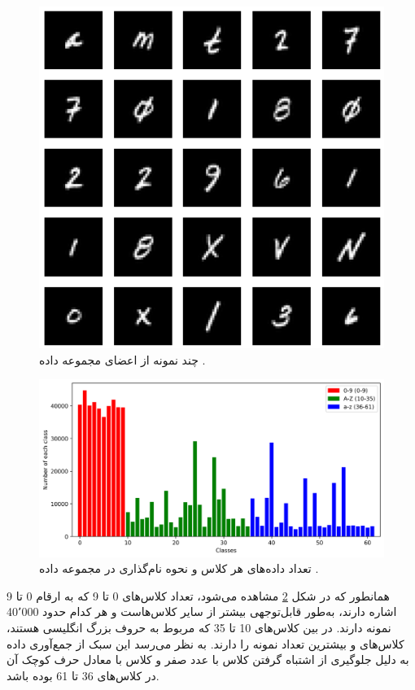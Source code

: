 \begin{figure}[b!]
	\centering
	\includegraphics[scale=0.5]{images/chap5/femnist.png}%
	\caption{%
		چند نمونه از اعضای مجموعه داده
		\cite{holzer2023dynamically}.
	}
	\label{femnist}
	\centering
\end{figure}


\begin{figure}[t]
	\centering
	\includegraphics[scale=0.7]{images/chap5/count_all_classes.png}%
	\caption{%
تعداد داده‌های هر کلاس و نحوه نام‌گذاری در مجموعه داده
		.
	}
	\label{count_all_classes}
	\centering
\end{figure}

همانطور که در شکل
\ref{count_all_classes}
مشاهده می‌شود، تعداد کلاس‌های 0 تا 9 که به ارقام 0 تا 9 اشاره دارند، به‌طور قابل‌توجهی بیشتر از سایر کلاس‌هاست و هر کدام حدود 40٬000 نمونه دارند. در بین کلاس‌های 10 تا 35 که مربوط به حروف بزرگ انگلیسی هستند، کلاس‌های  و  بیشترین تعداد نمونه را دارند. به نظر می‌رسد این سبک از جمع‌آوری داده به دلیل جلوگیری از اشتباه گرفتن کلاس  با عدد صفر و کلاس  با معادل حرف کوچک آن در کلاس‌های 36 تا 61 بوده باشد.


